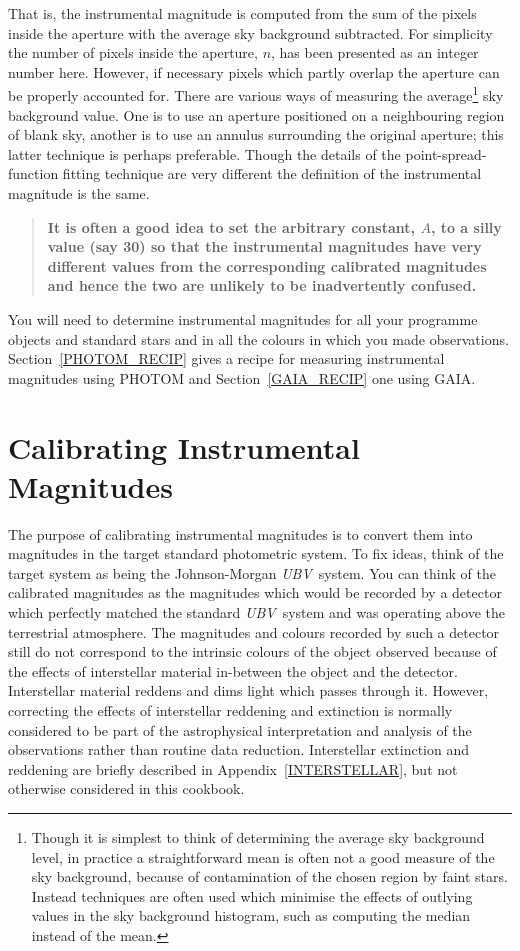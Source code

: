 \documentclass[twoside,11pt]{article}
\newcommand{\xlabel}[1]{}
\begin{document}
That is, the instrumental magnitude is computed from the sum of the
pixels inside the aperture with the average sky background subtracted.
For simplicity the number of pixels inside the aperture, $n$, has been
presented as an integer number here.  However, if necessary pixels
which partly overlap the aperture can be properly accounted for.  There
are various ways of measuring the average\footnote{Though it is simplest
to think of determining the average sky background level, in practice
a straightforward mean is often not a good measure of the sky
background, because of contamination of the chosen region by faint stars.
Instead techniques are often used which minimise the effects of outlying
values in the sky background histogram, such as computing the median
instead of the mean.} sky background value.  One is to use an aperture
positioned on a neighbouring region of blank sky, another is to use an
annulus surrounding the original aperture; this latter technique is
perhaps preferable.  Though the details of the point-spread-function
fitting technique are very different the definition of the instrumental
magnitude is the same.

\begin{quote}
{\bf It is often a good idea to set the arbitrary constant, $A$, to a
silly value (say 30) so that the instrumental magnitudes have very
different values from the corresponding calibrated magnitudes and
hence the two are unlikely to be inadvertently confused.}
\end{quote}

You will need to determine instrumental magnitudes for all your
programme objects and standard stars and in all the colours in which
you made observations.  Section~\ref{PHOTOM_RECIP} gives a recipe
for measuring instrumental magnitudes using PHOTOM and
Section~\ref{GAIA_RECIP} one using GAIA.


\section{\xlabel{CALIB_INSTR}\label{CALIB_INSTR}Calibrating Instrumental
Magnitudes}

The purpose of calibrating instrumental magnitudes is to convert them
into magnitudes in the target standard photometric system.  To fix
ideas, think of the target system as being the Johnson-Morgan {\it
UBV}\, system.  You can think of the calibrated magnitudes as the
magnitudes which would be recorded by a detector which perfectly
matched the standard {\it UBV}\, system and was operating above the
terrestrial atmosphere.  The magnitudes and colours recorded by such
a detector still do not correspond to the intrinsic colours of the
object observed because of the effects of interstellar material in-between
the object and the detector.  Interstellar material reddens and dims
light which passes through it.  However, correcting the effects of
interstellar reddening and extinction is normally considered to be part
of the astrophysical interpretation and analysis of the observations rather
than routine data reduction.  Interstellar extinction and reddening are
briefly described in Appendix~\ref{INTERSTELLAR}, but not otherwise
considered in this cookbook.
\end{document}

